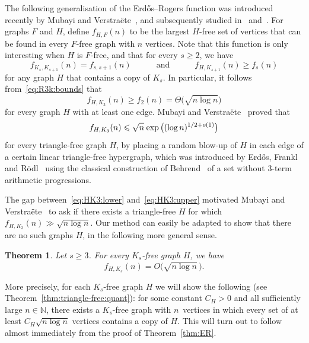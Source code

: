 \documentclass[12pt,reqno]{amsart}
\newtheorem{theorem}{Theorem}
\theoremstyle{remark}
\numberwithin{theorem}{section}
\renewcommand{\(}{\bigl(}
\renewcommand{\)}{\bigr)\vphantom{)}}
\renewcommand{\le}{\leqslant}
\renewcommand{\ge}{\geqslant}
\newcommand{\N}{\mathbb N}
\begin{document}
The following generalisation of the Erd\H{o}s--Rogers function was introduced recently by Mubayi and Verstra\"{e}te~\cite{MV24b}, and subsequently studied in~\cite{BCL25} and~\cite{GJS25}. %
For graphs $F$ and $H$, define $f_{H,F}(n)$ to be the largest $H$-free set of vertices that can be found in every $F$-free graph with $n$ vertices. Note that this function is only interesting when $H$ is $F$-free, and that for every $s \ge 2$, we have
\begin{equation}\label{eq:HKs:lower}
f_{K_s,K_{s+1}}(n) = f_{s,s+1}(n) \quad \qquad \text{and} \qquad \quad f_{H,K_{s+1}}(n) \ge f_s(n)
\end{equation}
for any graph $H$ that contains a copy of $K_s$. In particular, it follows from~\eqref{eq:R3k:bounds} that
\begin{equation}\label{eq:HK3:lower}
f_{H,K_3}(n) \ge f_2(n) = \Theta\big( \sqrt{n \log n} \big) 
\end{equation}
for every graph $H$ with at least one edge. Mubayi and Verstra\"{e}te~\cite{MV24b} proved that
\begin{equation}\label{eq:HK3:upper}
f_{H,K_3}(n) \le \sqrt{n} \hspace{0.03cm} \exp\big( (\log n)^{1/2+o(1)} \big)
\end{equation}
for every triangle-free graph $H$, by placing a random blow-up of $H$ in each edge of a certain linear triangle-free hypergraph, which was introduced by Erd\H{o}s, Frankl and R\"odl~\cite{EFR86} using the classical construction of Behrend~\cite{Be46} of a set without 3-term arithmetic progressions. 

The gap between~\eqref{eq:HK3:lower} and~\eqref{eq:HK3:upper} motivated Mubayi and Verstra\"{e}te~\cite[Problem~1]{MV24b} to ask if there exists a triangle-free $H$ for which $f_{H,K_3}(n) \gg \displaystyle{\sqrt{ n \log n}}$. Our method can easily be adapted to show that there are no such graphs $H$, in the following more general sense.

\begin{theorem}\label{thm:triangle-free}
Let $s \ge 3$. For every $K_s$-free graph $H$, we have
$$f_{H,K_s}(n) = O\big( \sqrt{n\log n} \, \big).$$
\end{theorem}

More precisely, for each $K_s$-free graph $H$ we will show the following (see Theorem~\ref{thm:triangle-free:quant}): for some constant 
$C_H > 0$ and all sufficiently large $n \in \N$, there exists a $K_s$-free graph with $n$~vertices in which every set of at least $C_H \displaystyle{\sqrt{ n \log n}}$ vertices contains a copy of $H$. This will turn out to follow almost immediately from the proof of Theorem~\ref{thm:ER}.
\end{document}
